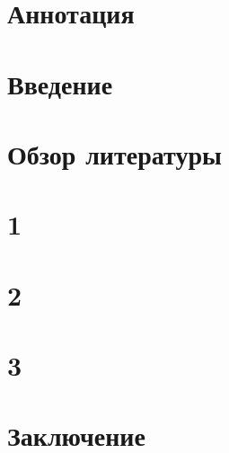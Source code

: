 \documentclass{spbau-diploma}
\begin{document}
\renewcommand\listingscaption{Листинг}
\newenvironment{megaalgorithm}[1][htb]{
    \floatname{algorithm}{Алгоритм}%
   \begin{algorithm}%
  }{\end{algorithm}}

%
\maketitle
\setcounter{page}{2}
\tableofcontents


\section*{Аннотация}


\section*{Введение}


\section{Обзор литературы}


\section{1}


\section{2}


\section{3}


\section*{Заключение}





\end{document}
